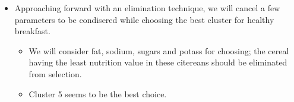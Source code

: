 \documentclass[
]{article}
\providecommand{\tightlist}{%
  \setlength{\itemsep}{0pt}\setlength{\parskip}{0pt}}
\begin{document}
\begin{itemize}
\tightlist
\item
  Approaching forward with an elimination technique, we will cancel a
  few parameters to be condisered while choosing the best cluster for
  healthy breakfast.

  \begin{itemize}
  \tightlist
  \item
    We will consider fat, sodium, sugars and potass for choosing; the
    cereal having the least nutrition value in these citereans should be
    eliminated from selection.
  \item
    Cluster 5 seems to be the best choice.
  \end{itemize}
\end{itemize}
\end{document}
